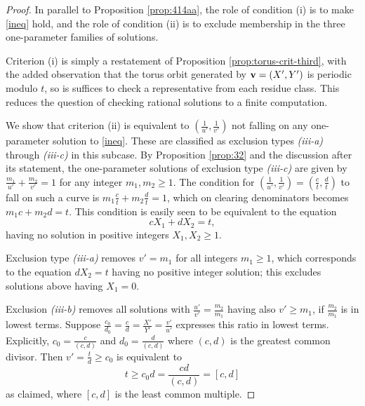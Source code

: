 \documentclass[12pt,letterpaper, reqno]{amsart}
\theoremstyle{definition}
\theoremstyle{remark}
\newcommand{\uu}{{u'}}
\newcommand{\vv}{{v'}}
\newcommand{\bv}{{\bf v}}
\begin{document}
\begin{proof}
In parallel to Proposition \ref{prop:414aa},   the role of condition (i) is   to make \eqref{ineq} hold, and
the role of  condition (ii) is to exclude membership in the three one-parameter families of solutions. 

Criterion (i) is simply a restatement of Proposition \ref{prop:torus-crit-third}, with the added observation that the torus orbit generated by $\bv = (X',Y')$ is periodic modulo $t$, so is suffices to check a representative from each residue class.
This reduces the question of checking rational solutions to a finite computation.


We show that criterion (ii) is equivalent to $(\frac{1}{\uu}, \frac1{\vv})$ not falling on any one-parameter solution to \eqref{ineq}.
These are classified as exclusion types {\it (iii-a)} through {\it (iii-c)} in this subcase. 
By Proposition \ref{prop:32} and the discussion after its statement,
the  one-parameter solutions of exclusion type {\it (iii-c)}  are  given by $\frac{m_1}{{\uu}} + \frac{m_2}{{\vv}} =1$
for any integer $m_1, m_2 \ge 1$. 
  The  condition for $(\frac{1}{\uu}, \frac1\vv) = (\frac{c}{t}, \frac{d}{t})$ 
 to fall on such a curve 
is  $m_1 \frac{c}{t}  + m_2 \frac{d}{t}= 1$, which on clearing denominators becomes 
 $m_1 c + m_2 d= t$. This condition is easily seen to be equivalent to the equation 
$$
cX_1 + dX_2 = t,
$$
having no solution in positive integers $X_1, X_2 \ge 1$. 

Exclusion type {\it (iii-a)} removes $\vv= m_1$ for all integers $m_1 \ge 1$, which corresponds to 
the equation $d X_2= t$
having no positive integer solution; this excludes solutions above having $X_1=0$. 

Exclusion {\it (iii-b)}  removes all solutions
with $\frac\uu\vv = \frac{m_2}{m_1}$ having also   $\vv \geq {m_1}$, if $\frac{m_2}{m_1}$ is in lowest terms. 
Suppose $\frac{c_0}{d_0} = \frac{c}{d} = \frac{X'}{Y'} = \frac{\vv}{\uu}$ expresses this ratio in lowest terms. 
Explicitly, $c_0 = \frac{c}{(c,d)}$ and $d_0 = \frac{d}{(c,d)}$ where $(c,d)$ is the greatest common divisor.
Then $\vv =\frac{t}{d} \geq c_0$  is equivalent to 
\[ t \geq c_0d = \frac{cd}{(c,d)} = [c,d] \]
as claimed, where $[c,d]$ is the least common multiple.
\end{proof}
\end{document}
